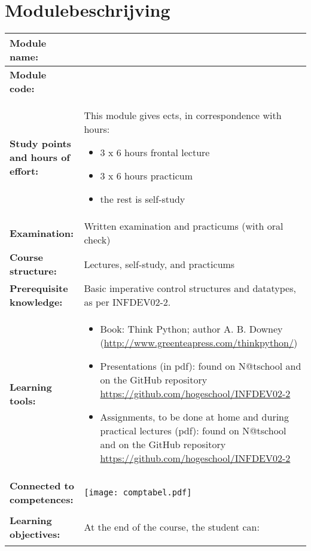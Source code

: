 \section*{Modulebeschrijving}
\begin{tabularx}{\textwidth}{|>{\columncolor{lichtGrijs}} p{}|X|}
	\hline
	\textbf{Module name:} & \modulenaam\\
	\hline
	\textbf{Module code: }& \modulecode\\
	\hline
	\textbf{Study points \newline and hours of effort:} & This module gives \stdPunten{}  ects, in correspondence with \FPeval{\result}{clip(\stdPunten*28)}\result{} hours:
	\begin{itemize}
		\item 3 x 6 hours frontal lecture
		\item 3 x 6 hours practicum
		\item the rest is self-study
	\end{itemize} \\
	\hline
	\textbf{Examination:} & Written examination and practicums (with oral check) \\
	\hline
	\textbf{Course structure:} & Lectures, self-study, and practicums \\
	\hline
	\textbf{Prerequisite knowledge:} & Basic imperative control structures and datatypes, as per INFDEV02-2. \\
	\hline
	\textbf{Learning tools:}  &
		\begin{itemize}
			\item Book: Think Python; author A. B. Downey (\url{http://www.greenteapress.com/thinkpython/})
			\item Presentations (in pdf): found on N@tschool and on the GitHub repository \url{https://github.com/hogeschool/INFDEV02-2}
			\item Assignments, to be done at home and during practical lectures (pdf): found on N@tschool and on the GitHub repository \url{https://github.com/hogeschool/INFDEV02-2}
		\end{itemize} \\
	\hline
	\textbf{Connected to \newline competences:} &
	\begin{center}
		\texttt{[image: comptabel.pdf]}
	\end{center}\\
	\hline
	\textbf{Learning objectives:} &
		At the end of the course, the student can:
			\begin{itemize}

\end{itemize}
\end{tabularx}
